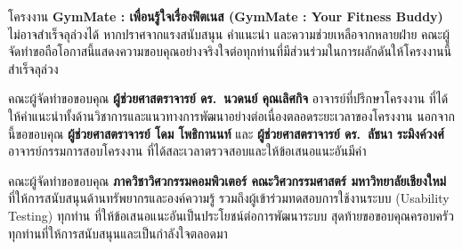 %

\begin{acknowledgments}
โครงงาน \textbf{GymMate : เพื่อนรู้ใจเรื่องฟิตเนส (GymMate : Your Fitness Buddy)} ไม่อาจสำเร็จลุล่วงได้ หากปราศจากแรงสนับสนุน คำแนะนำ และความช่วยเหลือจากหลายฝ่าย คณะผู้จัดทำขอถือโอกาสนี้แสดงความขอบคุณอย่างจริงใจต่อทุกท่านที่มีส่วนร่วมในการผลักดันให้โครงงานนี้สำเร็จลุล่วง

คณะผู้จัดทำขอขอบคุณ \textbf{ผู้ช่วยศาสตราจารย์ ดร.\ นวดนย์ คุณเลิศกิจ} อาจารย์ที่ปรึกษาโครงงาน ที่ได้ให้คำแนะนำทั้งด้านวิชาการและแนวทางการพัฒนาอย่างต่อเนื่องตลอดระยะเวลาของโครงงาน นอกจากนี้ขอขอบคุณ \textbf{ผู้ช่วยศาสตราจารย์ โดม โพธิกานนท์} และ \textbf{ผู้ช่วยศาสตราจารย์ ดร.\ ลัชนา ระมิงค์วงศ์} อาจารย์กรรมการสอบโครงงาน ที่ได้สละเวลาตรวจสอบและให้ข้อเสนอแนะอันมีค่า

คณะผู้จัดทำขอขอบคุณ \textbf{ภาควิชาวิศวกรรมคอมพิวเตอร์ คณะวิศวกรรมศาสตร์ มหาวิทยาลัยเชียงใหม่} ที่ให้การสนับสนุนด้านทรัพยากรและองค์ความรู้ รวมถึงผู้เข้าร่วมทดสอบการใช้งานระบบ (Usability Testing) ทุกท่าน ที่ให้ข้อเสนอแนะอันเป็นประโยชน์ต่อการพัฒนาระบบ สุดท้ายขอขอบคุณครอบครัวทุกท่านที่ให้การสนับสนุนและเป็นกำลังใจตลอดมา

\end{acknowledgments}
\fi %

\contentspage

\ifproject
\figurelistpage

\tablelistpage
\fi %



